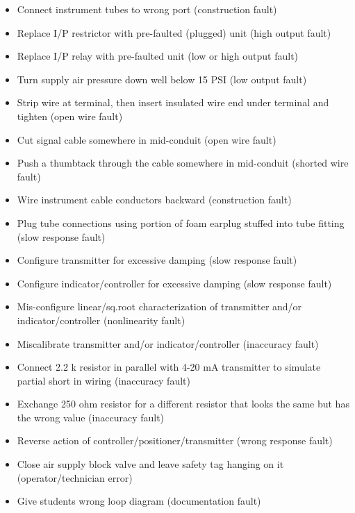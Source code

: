 \begin{itemize}
\item{} Connect instrument tubes to wrong port (construction fault)
\item{} Replace I/P restrictor with pre-faulted (plugged) unit (high output fault)
\item{} Replace I/P relay with pre-faulted unit (low or high output fault)
\item{} Turn supply air pressure down well below 15 PSI (low output fault)
\item{} Strip wire at terminal, then insert insulated wire end under terminal and tighten (open wire fault)
\item{} Cut signal cable somewhere in mid-conduit (open wire fault)
\item{} Push a thumbtack through the cable somewhere in mid-conduit (shorted wire fault)
\item{} Wire instrument cable conductors backward (construction fault)
\item{} Plug tube connections using portion of foam earplug stuffed into tube fitting (slow response fault)
\item{} Configure transmitter for excessive damping (slow response fault)
\item{} Configure indicator/controller for excessive damping (slow response fault)
\item{} Mis-configure linear/sq.root characterization of transmitter and/or indicator/controller (nonlinearity fault)
\item{} Miscalibrate transmitter and/or indicator/controller (inaccuracy fault)
\item{} Connect 2.2 k resistor in parallel with 4-20 mA transmitter to simulate partial short in wiring (inaccuracy fault)
\item{} Exchange 250 ohm resistor for a different resistor that looks the same but has the wrong value (inaccuracy fault) 
\item{} Reverse action of controller/positioner/transmitter (wrong response fault)
\item{} Close air supply block valve and leave safety tag hanging on it (operator/technician error)
\item{} Give students wrong loop diagram (documentation fault)
\end{itemize}














